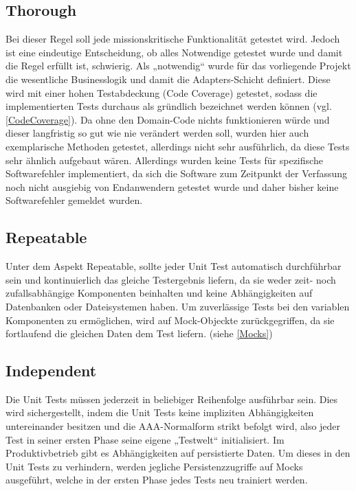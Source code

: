 \subsection{Thorough}

Bei dieser Regel soll jede missionskritische Funktionalität getestet wird. Jedoch ist eine eindeutige Entscheidung, ob alles Notwendige getestet wurde und damit die Regel erfüllt ist, schwierig. Als „notwendig“ wurde für das vorliegende Projekt die wesentliche Businesslogik und damit die Adapters-Schicht definiert. Diese wird mit einer hohen Testabdeckung (Code Coverage) getestet, sodass die implementierten Tests durchaus als gründlich bezeichnet werden können (vgl. \autoref{CodeCoverage}). Da ohne den Domain-Code nichts funktionieren würde und dieser langfristig so gut wie nie verändert werden soll, wurden hier auch exemplarische Methoden getestet, allerdings nicht sehr ausführlich, da diese Tests sehr ähnlich aufgebaut wären. Allerdings wurden keine Tests für spezifische Softwarefehler implementiert, da sich die Software zum Zeitpunkt der Verfassung noch nicht ausgiebig von Endanwendern getestet wurde und daher bisher keine Softwarefehler gemeldet wurden.

\subsection{Repeatable}

Unter dem Aspekt Repeatable, sollte jeder Unit Test automatisch durchführbar sein und kontinuierlich das gleiche Testergebnis liefern, da sie weder zeit- noch zufallsabhängige Komponenten beinhalten und keine Abhängigkeiten auf Datenbanken oder Dateisystemen haben. Um zuverlässige Tests bei den variablen Komponenten zu ermöglichen, wird auf Mock-Objeckte zurückgegriffen, da sie fortlaufend die gleichen Daten dem Test liefern. (siehe \autoref{Mocks})


\subsection{Independent}

Die Unit Tests müssen jederzeit in beliebiger Reihenfolge ausführbar sein. Dies wird sichergestellt, indem die Unit Tests keine impliziten Abhängigkeiten untereinander besitzen und die AAA-Normalform strikt befolgt wird, also jeder Test in seiner ersten Phase seine eigene „Testwelt“ initialisiert. Im Produktivbetrieb gibt es Abhängigkeiten auf persistierte Daten. Um dieses in den Unit Tests zu verhindern, werden jegliche Persistenzzugriffe auf Mocks ausgeführt, welche in der ersten Phase jedes Tests neu trainiert werden.

